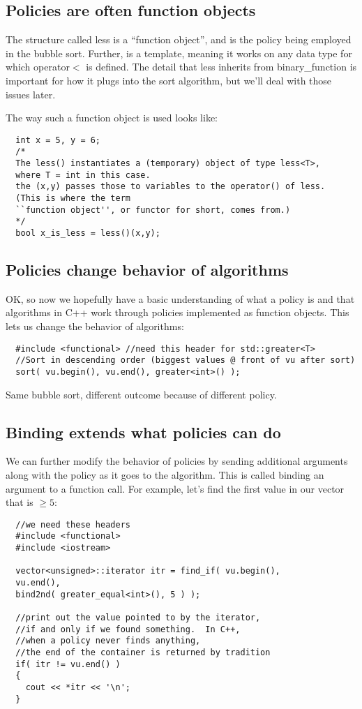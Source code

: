 \documentclass{article}
\begin{document}
\subsection{Policies are often function objects}
The structure called less is a ``function object'', and is the policy being employed in the bubble sort.  Further, is a template, meaning it works on any data type for which operator$<$ is defined.  The detail that less inherits from binary\_function is important for how it plugs into the sort algorithm, but we'll deal with those issues later.

The way such a function object is used looks like:
\begin{lstlisting}
  int x = 5, y = 6;
  /*
  The less() instantiates a (temporary) object of type less<T>,
  where T = int in this case.
  the (x,y) passes those to variables to the operator() of less.
  (This is where the term
  ``function object'', or functor for short, comes from.)
  */
  bool x_is_less = less()(x,y);
\end{lstlisting}

\subsection{Policies change behavior of algorithms}
OK, so now we hopefully have a basic understanding of what a policy is and that algorithms in C++ work through policies implemented as function objects.  This lets us change the behavior of algorithms:
\begin{lstlisting}
  #include <functional> //need this header for std::greater<T>
  //Sort in descending order (biggest values @ front of vu after sort)
  sort( vu.begin(), vu.end(), greater<int>() );
\end{lstlisting}
Same bubble sort, different outcome because of different policy.

\subsection{Binding extends what policies can do}
We can further modify the behavior of policies by sending additional arguments along with the policy as it goes to the algorithm.  This is called binding an argument to a function call. For example, let's find the first value in our vector that is $\geq 5$:
\begin{lstlisting}
  //we need these headers
  #include <functional>
  #include <iostream>

  vector<unsigned>::iterator itr = find_if( vu.begin(), 
  vu.end(), 
  bind2nd( greater_equal<int>(), 5 ) );

  //print out the value pointed to by the iterator, 
  //if and only if we found something.  In C++,
  //when a policy never finds anything, 
  //the end of the container is returned by tradition
  if( itr != vu.end() )
  {
    cout << *itr << '\n';
  }
\end{lstlisting}
\end{document}
